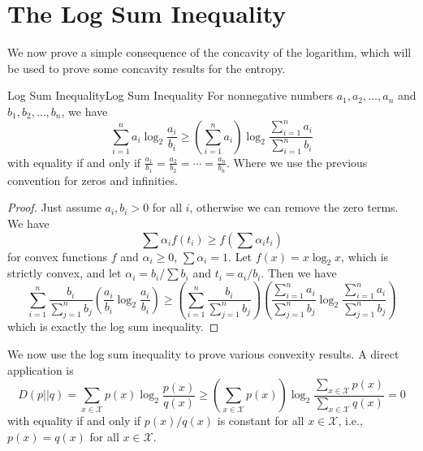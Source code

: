 \documentclass[../main.tex]{subfiles}
\begin{document}
\section{The Log Sum Inequality}
We now prove a simple consequence of the concavity of the logarithm, which will be used to prove some concavity results for the entropy.

\begin{theorem}{Log Sum Inequality}{Log Sum Inequality}
  For nonnegative numbers $a_1, a_2, \ldots, a_n$ and $b_1, b_2, \ldots, b_n$, we have
  \begin{equation}
    \sum_{i=1}^n a_i \log_2 \frac{a_i}{b_i} \geq \left(\sum_{i=1}^n a_i\right) \log_2 \frac{\sum_{i=1}^n a_i}{\sum_{i=1}^n b_i}
  \end{equation}
  with equality if and only if $\displaystyle \frac{a_1}{b_1} = \frac{a_2}{b_2} = \cdots = \frac{a_n}{b_n}$. Where we use the previous convention for zeros and infinities.
\end{theorem}
\begin{proof}
  Just assume $a_i, b_i > 0$ for all $i$, otherwise we can remove the zero terms. We have
  \begin{equation*}
    \sum \alpha_i f(t_i) \geq f\left(\sum \alpha_i t_i\right)
  \end{equation*}
  for convex functions $f$ and $\alpha_i \geq 0$, $\sum \alpha_i = 1$. Let $f(x) = x \log_2 x$, which is strictly convex, and let $\alpha_i = b_i / \sum b_i$ and $t_i = a_i / b_i$. Then we have
  \begin{equation}
    \sum_{i=1}^n \frac{b_i}{\sum_{j=1}^n b_j} \left(\frac{a_i}{b_i} \log_2 \frac{a_i}{b_i}\right) \geq \left(\sum_{i=1}^n \frac{b_i}{\sum_{j=1}^n b_j}\right) \left(\frac{\sum_{i=1}^n a_i}{\sum_{j=1}^n b_j} \log_2 \frac{\sum_{i=1}^n a_i}{\sum_{j=1}^n b_j}\right)
  \end{equation}
  which is exactly the log sum inequality.
\end{proof}

We now use the log sum inequality to prove various convexity results. A direct application is
\begin{equation*}
  D(p||q) = \sum_{x \in \mathcal{X}} p(x) \log_2 \frac{p(x)}{q(x)} \geq \left(\sum_{x \in \mathcal{X}} p(x)\right) \log_2 \frac{\sum_{x \in \mathcal{X}} p(x)}{\sum_{x \in \mathcal{X}} q(x)} = 0
\end{equation*}
with equality if and only if $p(x) / q(x)$ is constant for all $x \in \mathcal{X}$, i.e., $p(x) = q(x)$ for all $x \in \mathcal{X}$.
\end{document}
